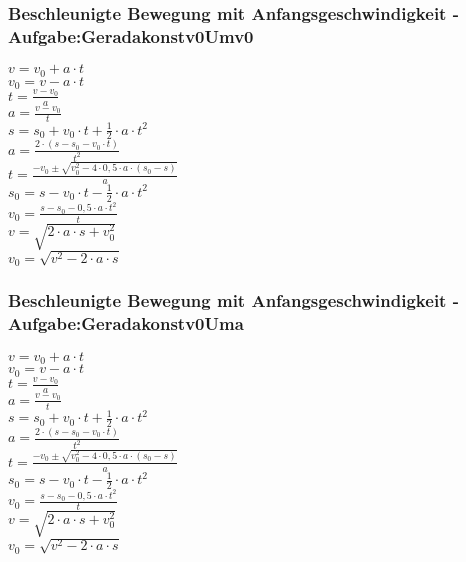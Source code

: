 \subsubsection{Beschleunigte Bewegung mit Anfangsgeschwindigkeit - Aufgabe:Geradakonstv0Umv0} 
\begin{minipage}{0.45\textwidth} 
$ v = v_{0}  + a\cdot t $\\ 
$ v_{0}  = v - a\cdot t $\\ 
$ t = \frac{v - v_{0} }{a} $\\ 
$ a = \frac{v - v_{0} }{  t} $\\ 
$ s = s_{0}  + v_{0} \cdot t + \frac{1}{2}\cdot a\cdot t^{2} $\\ 
$ a = \frac{2\cdot (s - s_{0}  - v_{0} \cdot t)}{     t^{2} } $\\ 
$ t = \frac{-v_{0}  \pm \sqrt{v_{0} ^{2} -4\cdot 0,5\cdot a\cdot (s_{0}  -s)}}{       a} $\\ 
$ s_{0}  = s - v_{0} \cdot t - \frac{1}{2}\cdot a\cdot t^{2} $\\ 
$ v_{0}  =\frac{s-s_{0} -0,5\cdot a\cdot t^{2} }{    t} $\\ 
$ v  =\sqrt{2\cdot a \cdot s+ v_{0}^2} $\\ 
$ v_{0}  =\sqrt{v^2-2\cdot a \cdot s} $\\ 
\end{minipage} 
\begin{minipage}{0.45\textwidth} 
 
\end{minipage} 
\subsubsection{Beschleunigte Bewegung mit Anfangsgeschwindigkeit - Aufgabe:Geradakonstv0Uma} 
\begin{minipage}{0.45\textwidth} 
$ v = v_{0}  + a\cdot t $\\ 
$ v_{0}  = v - a\cdot t $\\ 
$ t = \frac{v - v_{0} }{a} $\\ 
$ a = \frac{v - v_{0} }{  t} $\\ 
$ s = s_{0}  + v_{0} \cdot t + \frac{1}{2}\cdot a\cdot t^{2} $\\ 
$ a = \frac{2\cdot (s - s_{0}  - v_{0} \cdot t)}{     t^{2} } $\\ 
$ t = \frac{-v_{0}  \pm \sqrt{v_{0} ^{2} -4\cdot 0,5\cdot a\cdot (s_{0}  -s)}}{       a} $\\ 
$ s_{0}  = s - v_{0} \cdot t - \frac{1}{2}\cdot a\cdot t^{2} $\\ 
$ v_{0}  =\frac{s-s_{0} -0,5\cdot a\cdot t^{2} }{    t} $\\ 
$ v  =\sqrt{2\cdot a \cdot s+ v_{0}^2} $\\ 
$ v_{0}  =\sqrt{v^2-2\cdot a \cdot s} $\\ 
\end{minipage} 
\begin{minipage}{0.45\textwidth} 
 
\end{minipage} 
